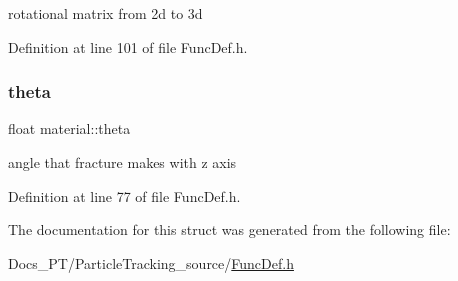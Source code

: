 rotational matrix from 2d to 3d 

Definition at line 101 of file Func\+Def.\+h.

\mbox{\label{structmaterial_add2db22d2a9dd5c1c2ec6f14038d43f6}} 
\subsubsection{\texorpdfstring{theta}{theta}}
{\footnotesize\ttfamily float material\+::theta}

angle that fracture makes with z axis 

Definition at line 77 of file Func\+Def.\+h.



The documentation for this struct was generated from the following file\+:\begin{DoxyCompactItemize}
\item 
Docs\+\_\+\+P\+T/\+Particle\+Tracking\+\_\+source/\mbox{\hyperlink{_func_def_8h}{Func\+Def.\+h}}\end{DoxyCompactItemize}
